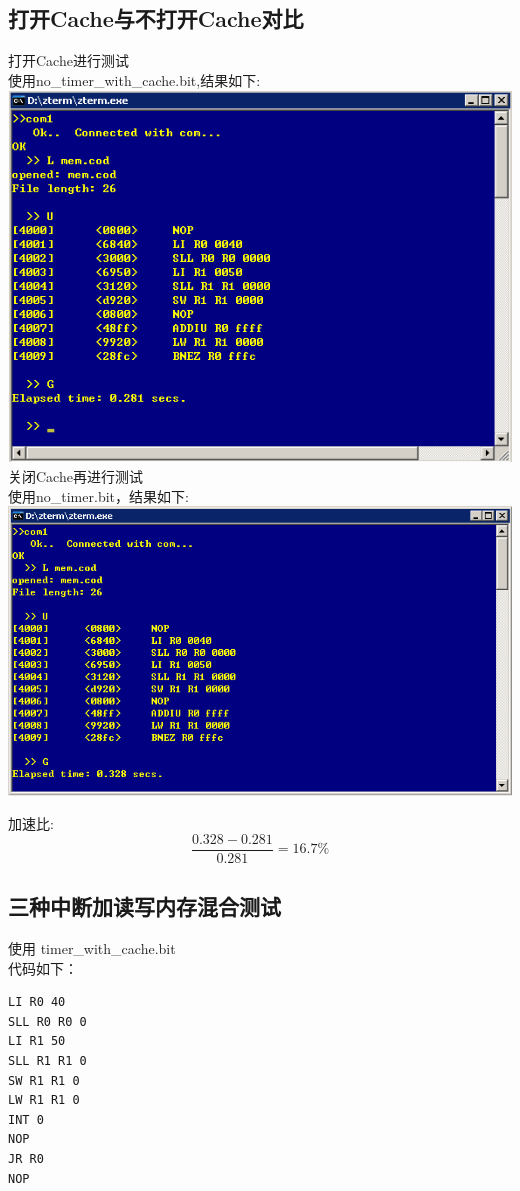 \documentclass[10pt]{article}
\begin{document}
\begin{CJK}{UTF8}{gbsn}
\subsection{打开Cache与不打开Cache对比}
打开Cache进行测试\\
使用no\_timer\_with\_cache.bit,结果如下:\\
\includegraphics[width=\linewidth]{cache.png}
关闭Cache再进行测试\\
使用no\_timer.bit，结果如下:\\
\includegraphics[width=\linewidth]{no_cache.png}

加速比:\\
$$\frac{0.328-0.281}{0.281}=16.7\%$$

\subsection{三种中断加读写内存混合测试}
使用 timer\_with\_cache.bit \\
代码如下：\\
\begin{verbatim}
LI R0 40
SLL R0 R0 0
LI R1 50
SLL R1 R1 0
SW R1 R1 0
LW R1 R1 0
INT 0
NOP
JR R0
NOP
\end{verbatim}


\end{CJK}
\end{document}
